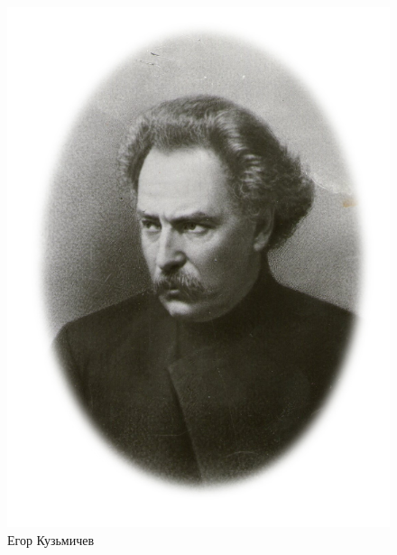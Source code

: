 \vspace*{2.5cm}
\begin{figure}[htp]
  \begin{center}
	  \includegraphics[scale=0.6]{kuzmichev_oval.pdf}
    \caption*{Егор Кузьмичев}
  \end{center}
\end{figure}
